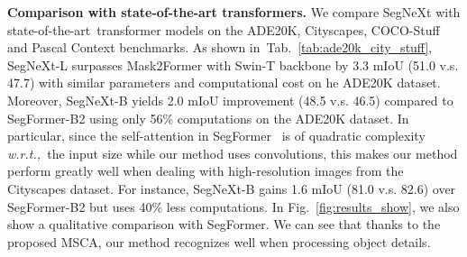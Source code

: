 \documentclass{article}
\def\wrt{\emph{w.r.t.,~}}
\def\sArt{state-of-the-art~}
\newcommand{\figref}[1]{Fig.~\ref{#1}}
\newcommand{\tabref}[1]{Tab.~\ref{#1}}
\begin{document}
\textbf{Comparison with state-of-the-art transformers.}
We compare SegNeXt with \sArt transformer models on the ADE20K, Cityscapes, COCO-Stuff and Pascal Context benchmarks.
As shown in~\tabref{tab:ade20k_city_stuff}, SegNeXt-L surpasses Mask2Former 
with Swin-T backbone by 3.3 mIoU (51.0 v.s. 47.7) with similar parameters and 
computational cost on he ADE20K dataset.
Moreover, SegNeXt-B yields 2.0 mIoU improvement (48.5 v.s. 46.5) compared to SegFormer-B2 
using only 56\% computations on the ADE20K dataset.
In particular, since the self-attention in SegFormer~\cite{xie2021segformer} is of quadratic complexity \wrt the input size while our method uses convolutions, this makes our method perform
greatly well when dealing with high-resolution images from the Cityscapes dataset.
For instance,  SegNeXt-B gains 1.6 mIoU (81.0 v.s. 82.6) over SegFormer-B2 
but uses 40\% less computations.
In \figref{fig:results_show}, we also show a qualitative comparison with SegFormer.
We can see that thanks to the proposed MSCA, our method recognizes well 
when processing object details.
\end{document}
